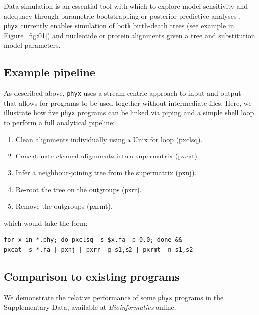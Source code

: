 \documentclass{bioinfo}
\begin{document}
\begin{methods}
Data simulation is an essential tool with which to explore model
sensitivity and adequacy through parametric bootstrapping or posterior
predictive analyses \citep{Bollback2002}. \texttt{phyx} currently enables
simulation of both
birth-death trees (see example in Figure~\ref{fig:01}) and nucleotide or
protein alignments given a tree and substitution model parameters.

\subsection{Example pipeline}%

As described above, \texttt{phyx} uses a stream-centric approach to input and output that allows for programs to be used together without intermediate files. Here, we illustrate how five \texttt{phyx} programs can be linked via piping
and a simple shell loop to perform a full analytical pipeline:
\begin{enumerate}
\item Clean alignments individually using a Unix for loop (pxclsq).
\item Concatenate cleaned alignments into a supermatrix (pxcat).
\item Infer a neighbour-joining tree from the supermatrix (pxnj).
\item Re-root the tree on the outgroups (pxrr).
\item Remove the outgroups (pxrmt).
\end{enumerate}
which would take the form:

\begin{verbatim}
for x in *.phy; do pxclsq -s $x.fa -p 0.0; done &&
pxcat -s *.fa | pxnj | pxrr -g s1,s2 | pxrmt -n s1,s2
\end{verbatim}

\subsection{Comparison to existing programs}


We demonstrate the relative performance of some \texttt{phyx} programs in
the Supplementary Data, available at \textit{Bioinformatics} online.


\end{methods}
\end{document}
